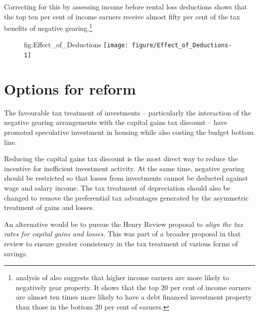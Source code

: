 \documentclass{grattan}\usepackage[]{graphicx}\usepackage[]{color}
\newcommand\gao{Grattan analysis of}
\newcommand{\highlight}[1]{\emph{#1}}
\begin{document}
Correcting for this by assessing income before rental loss deductions shows that the top ten per cent of income earners receive almost fifty per cent of the tax benefits of negative gearing.\footnote{\textcite{RBA2015} analysis of \textcite{HILDA2015} also suggests that higher income earners are more likely to negatively gear property. It shows that the top 20 per cent of income earners are almost ten times more likely to have a debt financed investment property than those in the bottom 20 per cent of earners.} 





\begin{figure}
  {fig:Effect_of_Deductions}
\texttt{[image: figure/Effect\_of\_Deductions-1]}

\source{\gao\ \textcite{ATO2013i}}
\end{figure}

\section{Options for reform}
The favourable tax treatment of investments -- particularly the interaction of the negative gearing arrangements with the capital gains tax discount -- have promoted speculative investment in housing while also costing the budget bottom line. 

Reducing the capital gains tax discount is the most direct way to reduce the incentive for inefficient investment activity. At the same time, negative gearing should be restricted so that losses from investments cannot be deducted against wage and salary income. The tax treatment of depreciation should also be changed to remove the preferential tax advantages generated by the asymmetric treatment of gains and losses. 

An alternative would be to pursue the Henry Review proposal to \highlight{align the tax rates for capital gains and losses.} This was part of a broader proposal in that review to ensure greater consistency in the tax treatment of various forms of savings.
\end{document}
